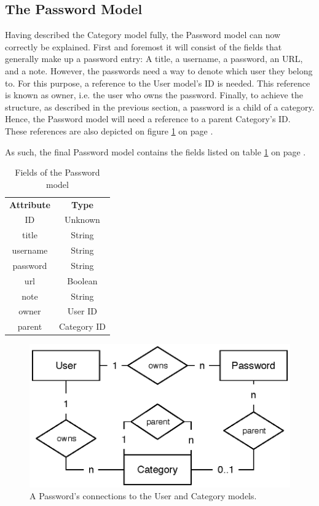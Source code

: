 		\subsection{The Password Model}
			\label{sec:model:password}
			Having described the Category model fully, the Password model can now correctly be explained. First and foremost it will consist of the fields that generally make up a password entry: A title, a username, a password, an URL, and a note. However, the passwords need a way to denote which user they belong to. For this purpose, a reference to the User model's ID is needed. This reference is known as owner, i.e. the user who owns the password. Finally, to achieve the structure, as described in the previous section, a password is a child of a category. Hence, the Password model will need a reference to a parent Category's ID. These references are also depicted on figure \ref{fig:relationship:password} on page \pageref{fig:relationship:password}.

			As such, the final Password model contains the fields listed on table \ref{fig:model:password} on page \pageref{fig:model:password}.

			\begin{table}[p]
				\centering
				\begin{tabular}{c|c}
					\textbf{Attribute} 		& \textbf{Type} 	\\
					ID 						& Unknown 			\\
					title 					& String 			\\
					username 				& String 			\\
					password 				& String 			\\
					url						& Boolean 			\\
					note  					& String 			\\
					owner 					& User ID 			\\
					parent 					& Category ID 		\\
				\end{tabular}
				\caption{Fields of the Password model}
				\label{fig:model:password}
			\end{table}
			
			\begin{figure}[p]
				\centering
				\includegraphics[scale=0.75]{figures/design/uml/erd/user-password-category.eps}
				\caption{A Password's connections to the User and Category models.}
				\label{fig:relationship:password}
			\end{figure}

